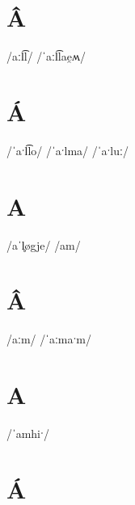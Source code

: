 \documentclass[10pt,a4paper,twoside]{book}
\begin{document}
\section*{Â}

\begin{multicols}{3}
 {/aːl͡l/} {}
 {/ˈaːl͡lae̯ʍ/} {}
\end{multicols}

\section*{Á}

\begin{multicols}{3}
 {/ˈaˑl͡lo/} {}
 {/ˈaˑlma/} {}
 {/ˈaˑluː/} {}
\end{multicols}

\section*{A}

\begin{multicols}{3}
 {/aˈl̥øgje/} {}
 {/am/} {}
\end{multicols}

\section*{Â}

\begin{multicols}{3}
 {/aːm/} {}
 {/ˈaːmaˑm/} {}
\end{multicols}

\section*{A}

\begin{multicols}{3}
 {/ˈamhiˑ/} {}
\end{multicols}

\section*{Á}
\end{document}
